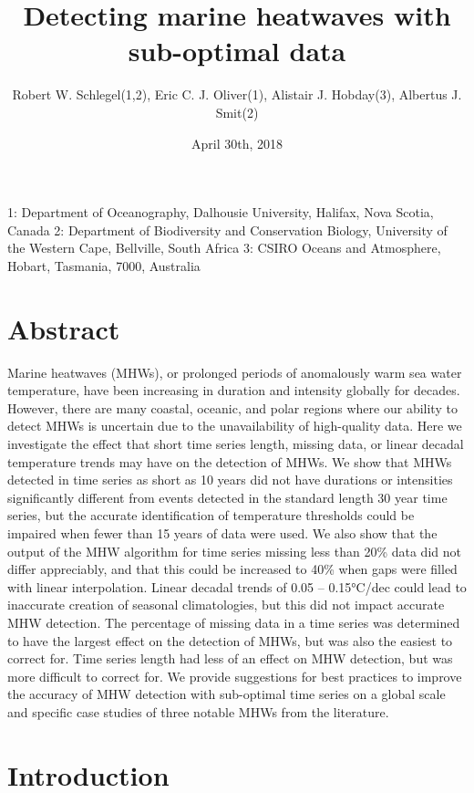 \documentclass[]{article}
\title{Detecting marine heatwaves with sub-optimal data}
\author{Robert W. Schlegel(1,2), Eric C. J. Oliver(1), Alistair J. Hobday(3),
Albertus J. Smit(2)}
\date{April 30th, 2018}
\begin{document}
\maketitle

1: Department of Oceanography, Dalhousie University, Halifax, Nova
Scotia, Canada 2: Department of Biodiversity and Conservation Biology,
University of the Western Cape, Bellville, South Africa 3: CSIRO Oceans
and Atmosphere, Hobart, Tasmania, 7000, Australia

\section{Abstract}\label{abstract}

Marine heatwaves (MHWs), or prolonged periods of anomalously warm sea
water temperature, have been increasing in duration and intensity
globally for decades. However, there are many coastal, oceanic, and
polar regions where our ability to detect MHWs is uncertain due to the
unavailability of high-quality data. Here we investigate the effect that
short time series length, missing data, or linear decadal temperature
trends may have on the detection of MHWs. We show that MHWs detected in
time series as short as 10 years did not have durations or intensities
significantly different from events detected in the standard length 30
year time series, but the accurate identification of temperature
thresholds could be impaired when fewer than 15 years of data were used.
We also show that the output of the MHW algorithm for time series
missing less than 20\% data did not differ appreciably, and that this
could be increased to 40\% when gaps were filled with linear
interpolation. Linear decadal trends of 0.05 -- 0.15°C/dec could lead to
inaccurate creation of seasonal climatologies, but this did not impact
accurate MHW detection. The percentage of missing data in a time series
was determined to have the largest effect on the detection of MHWs, but
was also the easiest to correct for. Time series length had less of an
effect on MHW detection, but was more difficult to correct for. We
provide suggestions for best practices to improve the accuracy of MHW
detection with sub-optimal time series on a global scale and specific
case studies of three notable MHWs from the literature.\\

\section{Introduction}\label{introduction}
\end{document}
